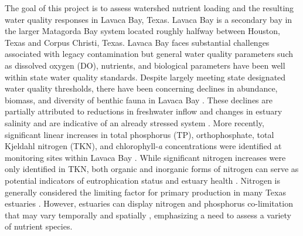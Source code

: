 \documentclass[fleqn,10pt,lineno]{wlpeerj} %
\begin{document}
The goal of this project is to assess watershed nutrient loading and the
resulting water quality responses in Lavaca Bay, Texas. Lavaca Bay is a
secondary bay in the larger Matagorda Bay system located roughly halfway
between Houston, Texas and Corpus Christi, Texas. Lavaca Bay faces
substantial challenges associated with legacy contamination but general
water quality parameters such as dissolved oxygen (DO), nutrients, and
biological parameters have been well within state water quality
standards. Despite largely meeting state designated water quality
thresholds, there have been concerning declines in abundance, biomass,
and diversity of benthic fauna in Lavaca Bay
\autocite{beserespollackLongtermTrendsResponse2011}. These declines are
partially attributed to reductions in freshwater inflow and changes in
estuary salinity and are indicative of an already stressed system
\autocite{beserespollackLongtermTrendsResponse2011,palmerImpactsDroughtsLow2015,montagnaAssessmentRelationshipFreshwater2020}.
More recently, significant linear increases in total phosphorus (TP),
orthophosphate, total Kjeldahl nitrogen (TKN), and chlorophyll-\emph{a}
concentrations were identified at monitoring sites within Lavaca Bay
\autocite{bugica_water_2020}. While significant nitrogen increases were
only identified in TKN, both organic and inorganic forms of nitrogen can
serve as potential indicators of eutrophication status and estuary
health \autocite{jessenMarineEutrophication2015}. Nitrogen is generally
considered the limiting factor for primary production in many Texas
estuaries
\autocite{gardnerNitrogenFixationDissimilatory2006,houTransformationFateNitrate2012,doradoUnderstandingInteractionsFreshwater2015,paudelRelationshipSuspendedSolids2019,wetz_exceptionally_2017}.
However, estuaries can display nitrogen and phosphorus co-limitation
that may vary temporally and spatially
\autocite{elserGlobalAnalysisNitrogen2007,conleyControllingEutrophicationNitrogen2009},
emphasizing a need to assess a variety of nutrient species.
\end{document}

